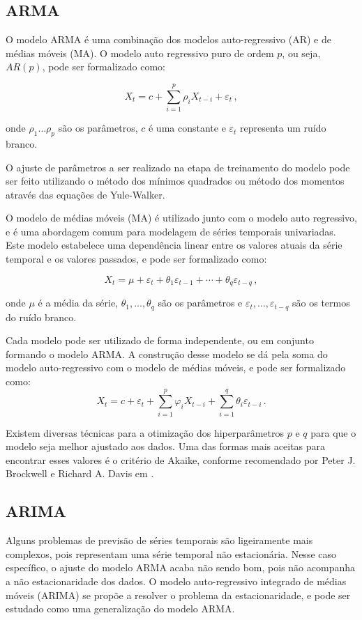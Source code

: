 \subsection{ARMA}
O modelo ARMA é uma combinação dos modelos auto-regressivo (AR) e de médias móveis (MA). O modelo auto regressivo puro de ordem $p$, ou seja, $AR(p)$, pode ser formalizado como:

\begin{equation}
    X_{t}=c+\sum ^{p}_{i=1}\rho _{i}X_{t-i}+\varepsilon _{t}\, ,
\end{equation}

onde $\rho _{1}\ldots \rho _{p}$ são os parâmetros, $c$ é uma constante e $\varepsilon _{t}$ representa um ruído branco.

O ajuste de parâmetros a ser realizado na etapa de treinamento do modelo pode ser feito utilizando o método dos mínimos quadrados ou método dos momentos através das equações de Yule-Walker.

O modelo de médias móveis (MA) é utilizado junto com o modelo auto regressivo, e é uma abordagem comum para modelagem de séries temporais univariadas. Este modelo estabelece uma dependência linear entre os valores atuais da série temporal e os valores passados, e pode ser formalizado como:

\begin{equation}
    X_{t}=\mu+\varepsilon_{t}+\theta_{1} \varepsilon_{t-1}+\cdots+\theta_{q} \varepsilon_{t-q}\, ,
\end{equation}

onde $\mu$ é a média da série, $\theta_{1}, ..., \theta_{q}$ são os parâmetros e $\varepsilon_{t}, ..., \varepsilon_{t-q}$ são os termos do ruído branco.

Cada modelo pode ser utilizado de forma independente, ou em conjunto formando o modelo ARMA. A construção desse modelo se dá pela soma do modelo auto-regressivo com o modelo de médias móveis, e pode ser formalizado como:
\begin{equation}
    X_{t}=c+\varepsilon_{t}+\sum_{i=1}^{p} \varphi_{i} X_{t-i}+\sum_{i=1}^{q} \theta_{i} \varepsilon_{t-i}\, .
\end{equation}

Existem diversas técnicas para a otimização dos hiperparâmetros $p$ e $q$ para que o modelo seja melhor ajustado aos dados. Uma das formas mais aceitas para encontrar esses valores é o critério de Akaike, conforme recomendado por Peter J. Brockwell e Richard A. Davis em \cite{akaike}.

\subsection{ARIMA}
Alguns problemas de previsão de séries temporais são ligeiramente mais complexos, pois representam uma série temporal não estacionária. Nesse caso específico, o ajuste do modelo ARMA acaba não sendo bom, pois não acompanha a não estacionaridade dos dados. O modelo auto-regressivo integrado de médias móveis (ARIMA) se propõe a resolver o problema da estacionaridade, e pode ser estudado como uma generalização do modelo ARMA.

